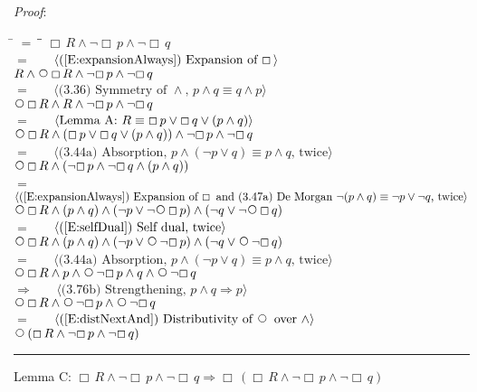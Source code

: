 \documentclass[12pt, fleqn, leqno]{article}
\newcommand{\lgap}{2pt}                             %
\newcommand{\mymathindent}{24pt}                    %
\newcommand{\impl}{\ensuremath{\Rightarrow}}        %
\newcommand{\Next}{\;\,\text{\raisebox{3.5pt}{\circle{6}}}}
\newcommand{\Always}{\Box\,}
\newcommand{\myqed}{\rule[-.23ex]{1.2ex}{2.0ex}}
\newcommand{\myqedtab}{\hspace{384pt}}              %
\newcommand{\Gll} {\langle}                         %
\newcommand{\Ggg} {\rangle}                         %
\newcommand{\Hint}[1]     {\ \ \ $\Gll              \mbox{#1} \Ggg$ }   %
\begin{document}
\emph{Proof}:
\begin{tabbing}
\hspace{\mymathindent} \= $= \;$ \= \myqedtab \= \kill
  \> \>   $\Always R \land \neg \Always p \land \neg \Always q$\\[\lgap]
  \> $=$  \>  \Hint{(\ref{E:expansionAlways}) Expansion of $\Always$}\\[\lgap]
  \> \>   $R \land \Next \Always R \land \neg \Always p \land \neg \Always q$\\[\lgap]
  \> $=$ \> \Hint{(3.36) Symmetry of $\land$, $p\land q \equiv q\land p$} \\[\lgap]
  \> \>   $ \Next \Always R \land R \land \neg \Always p \land \neg \Always q$\\[\lgap]
   \> $=$  \>  \Hint{Lemma A: $ R \equiv \Always p \lor \Always q \lor ( p \land q)$}\\[\lgap]
   \> \>   $ \Next \Always R \land (\Always p \lor \Always q \lor ( p \land q)) \land \neg \Always p \land \neg \Always q$\\[\lgap]
   \> $=$ \> \Hint{(3.44a) Absorption, $p\land (\neg p\lor q)\equiv p\land q$, twice} \\[\lgap]
   \> \>   $ \Next \Always R \land ( \neg \Always p \land \neg \Always q \land (p \land q))$\\[\lgap]
   \> $=$  \>  \Hint{(\ref{E:expansionAlways}) Expansion of $\Always$ and (3.47a) De Morgan $\neg (p \land q) \equiv \neg p \lor \neg q$, twice}\\[\lgap]
   \> \>   $ \Next \Always R \land (p \land q) \land ( \neg p \lor  \neg\Next \Always p) \land ( \neg q \lor \neg\Next \Always q)$\\[\lgap]
   \> $=$  \>  \Hint{(\ref{E:selfDual}) Self dual, twice}\\[\lgap]
   \> \>   $ \Next \Always R \land (p \land q) \land ( \neg p \lor \Next \neg \Always p) \land ( \neg q \lor \Next \neg \Always q)$\\[\lgap]
   \> $=$ \> \Hint{(3.44a) Absorption, $p\land (\neg p\lor q)\equiv p\land q$, twice} \\[\lgap]
   \> \>   $ \Next \Always R \land p \land  \Next \neg \Always p \land q \land \Next \neg \Always q$\\[\lgap]
    \> $\impl$  \>  \Hint{(3.76b) Strengthening, $p\land q \impl p$}\\[\lgap]
     \> \>   $ \Next \Always R  \land  \Next \neg \Always p \land \Next \neg \Always q$\\[\lgap]
      \> $=$  \>  \Hint{(\ref{E:distNextAnd}) Distributivity of $\Next$ over $\land$}\\[\lgap]
       \> \>   $ \Next (\Always R  \land \neg \Always p \land \neg \Always q)$ \quad \myqed
\end{tabbing}
Lemma C: $\Always R \land \neg \Always p \land \neg \Always q \impl \Always (\Always R \land \neg \Always p \land \neg \Always q)$
\end{document}
